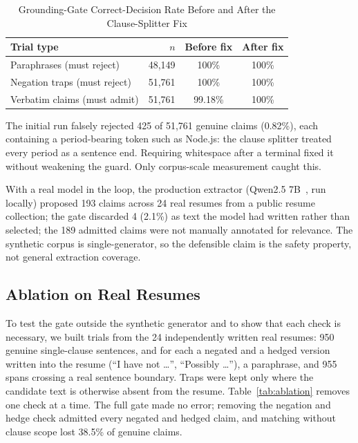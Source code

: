 \documentclass[conference,a4paper]{IEEEtran}
\begin{document}
\begin{table}[t]
\caption{Grounding-Gate Correct-Decision Rate Before and After the Clause-Splitter Fix}
\label{tab:gate}
\centering
\footnotesize
\begin{tabular}{@{}lrcc@{}}
\toprule
Trial type & $n$ & Before fix & After fix \\
\midrule
Paraphrases (must reject)    & 48,149 & 100\%   & 100\% \\
Negation traps (must reject) & 51,761 & 100\%   & 100\% \\
Verbatim claims (must admit) & 51,761 & 99.18\% & 100\% \\
\bottomrule
\end{tabular}
\end{table}

The initial run falsely rejected 425 of 51,761 genuine claims (0.82\%), each
containing a period-bearing token such as Node.js: the clause splitter treated
every period as a sentence end. Requiring whitespace after a terminal fixed it
without weakening the guard. Only corpus-scale measurement caught this.

With a real model in the loop, the production extractor (Qwen2.5 7B~\cite{qwen2024},
run locally) proposed 193 claims across 24 real resumes from a public
resume collection; the gate discarded 4 (2.1\%) as text the model had
written rather than selected; the 189 admitted claims were not manually
annotated for relevance. The synthetic corpus is single-generator, so the
defensible claim is the safety property, not general extraction coverage.

\subsection{Ablation on Real Resumes}
To test the gate outside the synthetic generator and to show that each check is
necessary, we built trials from the 24 independently written real resumes:
950 genuine single-clause sentences, and for each a negated and a hedged
version written into the resume (``I have not \ldots'', ``Possibly \ldots''),
a paraphrase, and 955 spans crossing a real sentence boundary. Traps were kept
only where the candidate text is otherwise absent from the resume.
Table~\ref{tab:ablation} removes one check at a time. The full gate made no
error; removing the negation and hedge check admitted every negated and hedged
claim, and matching without clause scope lost 38.5\% of genuine claims.
\end{document}
